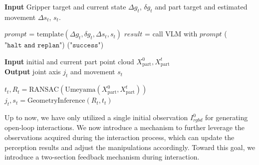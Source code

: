 \begin{algorithm} 
    \caption{Global Planner} 
    \label{alg4}
    \hspace*{\algorithmicindent} \textbf{Input} Gripper target and current state $\Delta g_t$,  $\delta g_t$ and part target and estimated movement $\Delta s_t$, $s_t$. 
    \begin{algorithmic}[1]
        \State $prompt$ = $\text{template}(\Delta g_t, \delta g_t, \Delta s_t, s_t)$ %
        \State $result$ = call VLM with $prompt$
            \EndCase
            \EndCase
            \Case($\texttt{"halt and replan"}$)
                 
            \EndCase
            \Case($\texttt{"success"}$)
            \EndCase
        \EndSwitch
    \end{algorithmic}
    \label{algo:planning_update}
\end{algorithm}
\begin{algorithm}
    \caption{Interactive perception}
    \label{alg3} 
    \hspace*{\algorithmicindent} \textbf{Input} initial and current part point cloud $X_\text{part}^0, X_\text{part}^t$  \\
    \hspace*{\algorithmicindent} \textbf{Output} joint axis $j_t$ and movement $s_t$ 
    \begin{algorithmic}[1]
        \State $t_t, R_t = \text{RANSAC}(\text{Umeyama}(X_\text{part}^0, X_\text{part}^t))$
        \State $j_t, s_t = \text{GeometryInference}(R_t, t_t)$
    \end{algorithmic}
    \label{algo:interactive_perception}
\end{algorithm}

Up to now, we have only utilized a single initial observation $I^0_{rgbd}$ for generating open-loop interactions. We now introduce a mechanism to further leverage the observations acquired during the interaction process, which can update the perception results and adjust the manipulations accordingly. Toward this goal, we introduce a two-section feedback mechanism during interaction.

